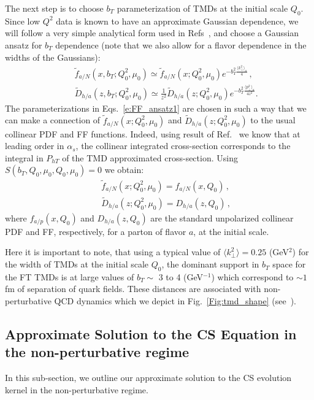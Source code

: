 \documentclass[final,3p,times,onecolumn,sort&compress,hidelinks]{elsarticle}
\newcommand\3[1]{\boldsymbol{#1}}
\newcommand{\crd}{\color{red}}
\begin{document}
The next step is to choose $b_T$ parameterization of TMDs at the initial scale $Q_0$.
 Since low $Q^2$ data is known \cite{Schweitzer:2010tt} to have an approximate Gaussian dependence, we will follow a very simple analytical form used in Refs~\cite{Anselmino:2013lza,Signori:2013mda}, and choose a Gaussian ansatz for $b_T$ dependence (note that we also allow for a flavor dependence in the widths of the Gaussians):
\begin{eqnarray}
&&\tilde f_{a/N} (x,b_T; Q_0^2, \mu_0)\simeq  \tilde f_{a/N} (x; Q_0^2, \mu_0) e^{-b_T^2 \frac{\langle k_\perp^2 \rangle_a}{4}}\,,
\nonumber \\[0.3cm]
&&\tilde D_{h/a}(z,b_T; Q_0^2, \mu_0)\simeq \frac{1}{z^2}  \tilde D_{h/a}(z; Q_0^2, \mu_0) e^{-b_T^2 \frac{\langle p_\perp^2 \rangle_a}{4 z^2}}.
\label{e:FF_ansatz1}
\end{eqnarray}
The parameterizations in Eqs.~\eqref{e:FF_ansatz1} are chosen in such a way that we can make a connection of $\tilde f_{a/N} (x; Q_0^2, \mu_0)$ and $\tilde D_{h/a}(z; Q_0^2, \mu_0)$ to the usual collinear PDF and FF functions. Indeed, using result of Ref.~\cite{Collins:2016hqq} we know that at leading order in $\alpha_s$, the collinear integrated cross-section corresponds to the integral in $P_{hT}$ of the TMD approximated cross-section. Using $S(b_T, Q_0, \mu_0, Q_0, \mu_0) = 0$ we obtain:
\begin{eqnarray}
&&\tilde f_{a/N} (x; Q_0^2, \mu_0) = f_{a/N} (x, Q_0)\,,
\\[0.3cm]
&&\tilde D_{h/a}(z; Q_0^2, \mu_0) = D_{h/a}(z, Q_0)\,,
\label{e:FF_ansatz2}
\end{eqnarray}
where $f_{a/p} (x, Q_0)$ and $D_{h/a}(z, Q_0)$ are the standard unpolarized collinear PDF and FF, respectively, for a parton of flavor $a$, at the initial scale.


Here it is important to note, that using a typical value of $\langle k_\perp^2 \rangle = 0.25$ (GeV$^2$) \cite{Anselmino:2005nn} for the width of TMDs at the initial scale $Q_0$, the dominant support in $b_T$ space  for the FT TMDs is at large values of $b_T \sim $ 3 to 4 (GeV$^{-1}$) which correspond to $\sim 1$ fm of separation of quark fields.  These distances are associated with non-perturbative QCD dynamics which we  depict in Fig.~\ref{Fig:tmd_shape}  (see~\cite{Aidala:2014hva}).


\subsection{Approximate Solution to the CS Equation in the non-perturbative regime}
 In this sub-section, we outline our approximate solution to the CS evolution kernel in the non-perturbative regime.
\end{document}
